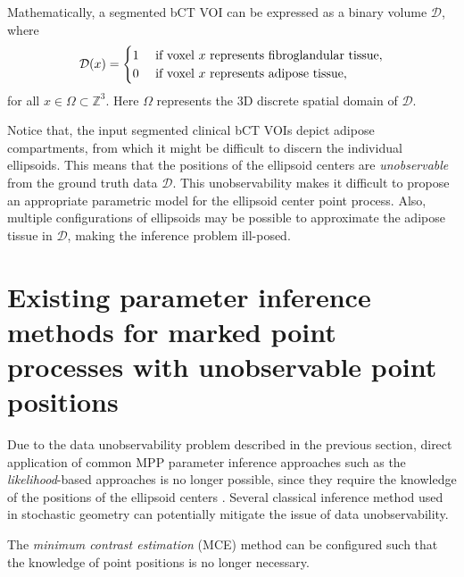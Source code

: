 \documentclass[journal]{IEEEtran}
\begin{document}
Mathematically, a segmented bCT VOI can be expressed as a binary
volume $\mathcal{D}$, where
\begin{equation}
  \label{eq:bct-discrete-form}
  \mathcal{D}(x) =
  \begin{cases}
    1 & \textnormal{ if voxel } x \textnormal{ represents
      fibroglandular tissue}, \\
    0 & \textnormal{ if voxel } x \textnormal{ represents
      adipose tissue}, \\
  \end{cases}
\end{equation}
for all $x \in \Omega \subset \mathbb{Z}^3$. Here $\Omega$ represents
the 3D discrete spatial domain of $\mathcal{D}$.

Notice that, the input segmented clinical bCT VOIs depict adipose
compartments, from which it might be difficult to discern the
individual ellipsoids. This means that the positions of the ellipsoid
centers are \textit{unobservable} from the ground truth data
$\mathcal{D}$. This unobservability makes it difficult to propose an
appropriate parametric model for the ellipsoid center point
process. Also, multiple configurations of ellipsoids may be possible
to approximate the adipose tissue in $\mathcal{D}$, making the
inference problem ill-posed.

\section{Existing parameter inference methods for marked point
  processes with unobservable point positions}
\label{sec:exist-param-infer}

Due to the data unobservability problem described in the previous
section, direct application of common MPP parameter inference
approaches such as the \textit{likelihood}-based approaches
\cite{moller2003statistical} \cite{baddeley2000practical}
\cite{besag1975statistical} \cite{jensen1991pseudolikelihood} is no
longer possible, since they require the knowledge of the positions of
the ellipsoid centers \cite{dereudre2014estimation}. Several classical
inference method used in stochastic geometry can potentially mitigate
the issue of data unobservability.

The \textit{minimum contrast estimation} (MCE) method can be
configured such that the knowledge of point positions is no longer
necessary.
\end{document}
